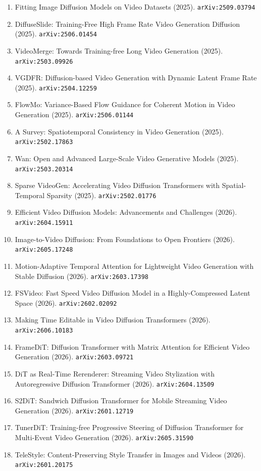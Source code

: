 \documentclass[11pt]{article}
\begin{document}
\begin{enumerate}
  \item Fitting Image Diffusion Models on Video Datasets (2025). \texttt{arXiv:2509.03794}
  \item DiffuseSlide: Training-Free High Frame Rate Video Generation Diffusion (2025). \texttt{arXiv:2506.01454}
  \item VideoMerge: Towards Training-free Long Video Generation (2025). \texttt{arXiv:2503.09926}
  \item VGDFR: Diffusion-based Video Generation with Dynamic Latent Frame Rate (2025). \texttt{arXiv:2504.12259}
  \item FlowMo: Variance-Based Flow Guidance for Coherent Motion in Video Generation (2025). \texttt{arXiv:2506.01144}
  \item A Survey: Spatiotemporal Consistency in Video Generation (2025). \texttt{arXiv:2502.17863}
  \item Wan: Open and Advanced Large-Scale Video Generative Models (2025). \texttt{arXiv:2503.20314}
  \item Sparse VideoGen: Accelerating Video Diffusion Transformers with
  Spatial-Temporal Sparsity (2025). \texttt{arXiv:2502.01776}
  \item Efficient Video Diffusion Models: Advancements and Challenges (2026). \texttt{arXiv:2604.15911}
  \item Image-to-Video Diffusion: From Foundations to Open Frontiers (2026). \texttt{arXiv:2605.17248}
  \item Motion-Adaptive Temporal Attention for Lightweight Video Generation with Stable Diffusion (2026). \texttt{arXiv:2603.17398}
  \item FSVideo: Fast Speed Video Diffusion Model in a Highly-Compressed Latent Space (2026). \texttt{arXiv:2602.02092}
  \item Making Time Editable in Video Diffusion Transformers (2026). \texttt{arXiv:2606.10183}
  \item FrameDiT: Diffusion Transformer with Matrix Attention for Efficient Video Generation (2026). \texttt{arXiv:2603.09721}
  \item DiT as Real-Time Rerenderer: Streaming Video Stylization with Autoregressive Diffusion Transformer (2026). \texttt{arXiv:2604.13509}
  \item S2DiT: Sandwich Diffusion Transformer for Mobile Streaming Video Generation (2026). \texttt{arXiv:2601.12719}
  \item TunerDiT: Training-free Progressive Steering of Diffusion Transformer for Multi-Event Video Generation (2026). \texttt{arXiv:2605.31590}
  \item TeleStyle: Content-Preserving Style Transfer in Images and Videos (2026). \texttt{arXiv:2601.20175}
\end{enumerate}
\end{document}
